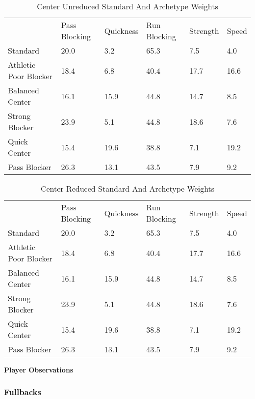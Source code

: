 \documentclass[11pt]{article}
\begin{document}
\begin{table}[]
\centering
\caption{Center Unreduced Standard And Archetype Weights}
\label{CenterUnreducedWeights}
\begin{tabular}{llllll}
                      & Pass Blocking & Quickness & Run Blocking & Strength & Speed \\
Standard              & 20.0          & 3.2       & 65.3         & 7.5      & 4.0   \\
Athletic Poor Blocker & 18.4          & 6.8       & 40.4         & 17.7     & 16.6  \\
Balanced Center       & 16.1          & 15.9      & 44.8         & 14.7     & 8.5   \\
Strong Blocker        & 23.9          & 5.1       & 44.8         & 18.6     & 7.6   \\
Quick Center          & 15.4          & 19.6      & 38.8         & 7.1      & 19.2  \\
Pass Blocker          & 26.3          & 13.1      & 43.5         & 7.9      & 9.2  
\end{tabular}
\end{table}

\begin{table}[]
\centering
\caption{Center Reduced Standard And Archetype Weights}
\label{CenterReducedWeights}
\begin{tabular}{llllll}
                      & Pass Blocking & Quickness & Run Blocking & Strength & Speed \\
Standard              & 20.0          & 3.2       & 65.3         & 7.5      & 4.0   \\
Athletic Poor Blocker & 18.4          & 6.8       & 40.4         & 17.7     & 16.6  \\
Balanced Center       & 16.1          & 15.9      & 44.8         & 14.7     & 8.5   \\
Strong Blocker        & 23.9          & 5.1       & 44.8         & 18.6     & 7.6   \\
Quick Center          & 15.4          & 19.6      & 38.8         & 7.1      & 19.2  \\
Pass Blocker          & 26.3          & 13.1      & 43.5         & 7.9      & 9.2  
\end{tabular}
\end{table}

\textbf{Player Observations}


\subsubsection{Fullbacks}
\end{document}
